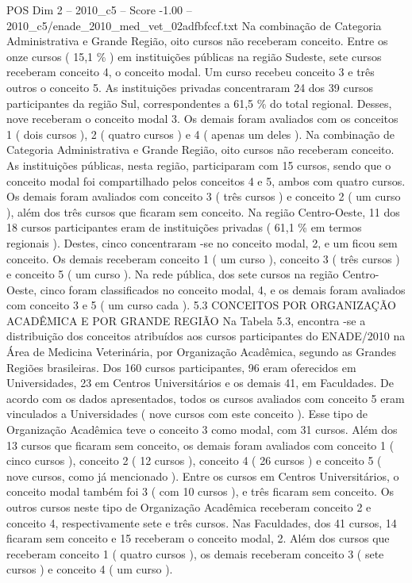 \begin{textsample}{POS Dim 2 – 2010\_c5 – Score -1.00 – 2010\_c5/enade\_2010\_med\_vet\_02adfbfccf.txt}
Na combinação de Categoria Administrativa e Grande Região, oito cursos não receberam conceito.
Entre os onze cursos ( 15,1 \% ) em instituições públicas na região Sudeste, sete cursos receberam conceito 4, o conceito modal.
Um curso recebeu conceito 3 e três outros o conceito 5.
As instituições privadas concentraram 24 dos 39 cursos participantes da região Sul, correspondentes a 61,5 \% do total regional.
Desses, nove receberam o conceito modal 3.
Os demais foram avaliados com os conceitos 1 ( dois cursos ), 2 ( quatro cursos ) e 4 ( apenas um deles ).
Na combinação de Categoria Administrativa e Grande Região, oito cursos não receberam conceito.
As instituições públicas, nesta região, participaram com 15 cursos, sendo que o conceito modal foi compartilhado pelos conceitos 4 e 5, ambos com quatro cursos.
Os demais foram avaliados com conceito 3 ( três cursos ) e conceito 2 ( um curso ), além dos três cursos que ficaram sem conceito.
Na região Centro-Oeste, 11 dos 18 cursos participantes eram de instituições privadas ( 61,1 \% em termos regionais ).
Destes, cinco concentraram -se no conceito modal, 2, e um ficou sem conceito.
Os demais receberam conceito 1 ( um curso ), conceito 3 ( três cursos ) e conceito 5 ( um curso ).
Na rede pública, dos sete cursos na região Centro-Oeste, cinco foram classificados no conceito modal, 4, e os demais foram avaliados com conceito 3 e 5 ( um curso cada ). 5.3 CONCEITOS POR ORGANIZAÇÃO ACADÊMICA E POR GRANDE REGIÃO Na Tabela 5.3, encontra -se a distribuição dos conceitos atribuídos aos cursos participantes do ENADE/2010 na Área de Medicina Veterinária, por Organização Acadêmica, segundo as Grandes Regiões brasileiras.
Dos 160 cursos participantes, 96 eram oferecidos em Universidades, 23 em Centros Universitários e os demais 41, em Faculdades.
De acordo com os dados apresentados, todos os cursos avaliados com conceito 5 eram vinculados a Universidades ( nove cursos com este conceito ).
Esse tipo de Organização Acadêmica teve o conceito 3 como modal, com 31 cursos.
Além dos 13 cursos que ficaram sem conceito, os demais foram avaliados com conceito 1 ( cinco cursos ), conceito 2 ( 12 cursos ), conceito 4 ( 26 cursos ) e conceito 5 ( nove cursos, como já mencionado ).
Entre os cursos em Centros Universitários, o conceito modal também foi 3 ( com 10 cursos ), e três ficaram sem conceito.
Os outros cursos neste tipo de Organização Acadêmica receberam conceito 2 e conceito 4, respectivamente sete e três cursos.
Nas Faculdades, dos 41 cursos, 14 ficaram sem conceito e 15 receberam o conceito modal, 2.
Além dos cursos que receberam conceito 1 ( quatro cursos ), os demais receberam conceito 3 ( sete cursos ) e conceito 4 ( um curso ).

\end{textsample}
